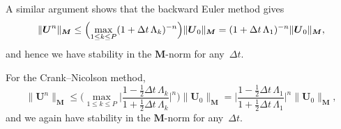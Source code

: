 \begin{example}
A similar argument shows that the backward Euler method gives
\[
\|\boldsymbol{U}^n\|_{\boldsymbol{M}}
    \le\Bigl(\max_{1\le k\le P}(1+\Delta t\,\Lambda_k)^{-n}\Bigr)
    \|\boldsymbol{U}_0\|_{\boldsymbol{M}}
	=(1+\Delta t\,\Lambda_1)^{-n}\|\boldsymbol{U}_0\|_{\boldsymbol{M}},
\]
and hence we have stability in the $\boldsymbol{M}$-norm for any~$\Delta t$.
\end{example}

\begin{example}
For the Crank--Nicolson method,
\[
\|\boldsymbol{U}^n\|_{\boldsymbol{M}}
    \le\biggl(\max_{1\le k\le P}\biggl|
    \frac{1-\tfrac12\Delta t\,\Lambda_k}{1+\tfrac12\Delta t\,\Lambda_k}
    \biggr|^n\biggr)\|\boldsymbol{U}_0\|_{\boldsymbol{M}}
=\biggl|\frac{1-\tfrac12\Delta t\,\Lambda_1}{1+\tfrac12\Delta t\,\Lambda_1}
	\biggr|^n\|\boldsymbol{U}_0\|_{\boldsymbol{M}},
\]
and we again have stability in the $\boldsymbol{M}$-norm for any~$\Delta t$.
\end{example}

